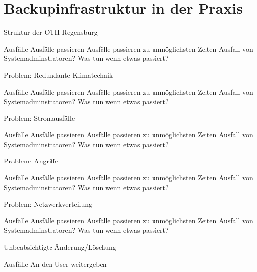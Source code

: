 \documentclass[10pt]{beamer}
\begin{document}
\section{Backupinfrastruktur in der Praxis}

\begin{frame}[fragile]{Struktur der OTH Regensburg}
\begin{alertblock}{Ausfälle}
	Ausfälle passieren
	Ausfälle passieren zu unmöglichsten Zeiten
	Ausfall von Systemadminstratoren?
	Was tun wenn etwas passiert?
\end{alertblock}
\end{frame}

\begin{frame}[fragile]{Problem: Redundante Klimatechnik}
\begin{alertblock}{Ausfälle}
	Ausfälle passieren
	Ausfälle passieren zu unmöglichsten Zeiten
	Ausfall von Systemadminstratoren?
	Was tun wenn etwas passiert?
\end{alertblock}
\end{frame}

\begin{frame}[fragile]{Problem: Stromausfälle}
\begin{alertblock}{Ausfälle}
	Ausfälle passieren
	Ausfälle passieren zu unmöglichsten Zeiten
	Ausfall von Systemadminstratoren?
	Was tun wenn etwas passiert?
\end{alertblock}
\end{frame}

\begin{frame}[fragile]{Problem: Angriffe}
\begin{alertblock}{Ausfälle}
	Ausfälle passieren
	Ausfälle passieren zu unmöglichsten Zeiten
	Ausfall von Systemadminstratoren?
	Was tun wenn etwas passiert?
\end{alertblock}
\end{frame}

\begin{frame}[fragile]{Problem: Netzwerkverteilung}
\begin{alertblock}{Ausfälle}
	Ausfälle passieren
	Ausfälle passieren zu unmöglichsten Zeiten
	Ausfall von Systemadminstratoren?
	Was tun wenn etwas passiert?
\end{alertblock}
\end{frame}

\begin{frame}[fragile]{Unbeabsichtigte Änderung/Löschung}
\begin{alertblock}{Ausfälle}
	An den User weitergeben
	
\end{alertblock}
\end{frame}
\end{document}
